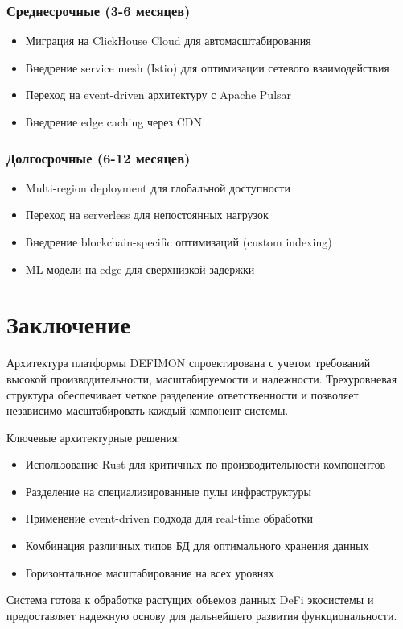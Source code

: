 \documentclass[a4paper,11pt]{article}
\begin{document}
\subsubsection{Среднесрочные (3-6 месяцев)}
\begin{itemize}
    \item Миграция на ClickHouse Cloud для автомасштабирования
    \item Внедрение service mesh (Istio) для оптимизации сетевого взаимодействия
    \item Переход на event-driven архитектуру с Apache Pulsar
    \item Внедрение edge caching через CDN
\end{itemize}

\subsubsection{Долгосрочные (6-12 месяцев)}
\begin{itemize}
    \item Multi-region deployment для глобальной доступности
    \item Переход на serverless для непостоянных нагрузок
    \item Внедрение blockchain-specific оптимизаций (custom indexing)
    \item ML модели на edge для сверхнизкой задержки
\end{itemize}

\section{Заключение}

Архитектура платформы DEFIMON спроектирована с учетом требований высокой производительности, масштабируемости и надежности. Трехуровневая структура обеспечивает четкое разделение ответственности и позволяет независимо масштабировать каждый компонент системы.

Ключевые архитектурные решения:
\begin{itemize}
    \item Использование Rust для критичных по производительности компонентов
    \item Разделение на специализированные пулы инфраструктуры
    \item Применение event-driven подхода для real-time обработки
    \item Комбинация различных типов БД для оптимального хранения данных
    \item Горизонтальное масштабирование на всех уровнях
\end{itemize}

Система готова к обработке растущих объемов данных DeFi экосистемы и предоставляет надежную основу для дальнейшего развития функциональности.
\end{document}

